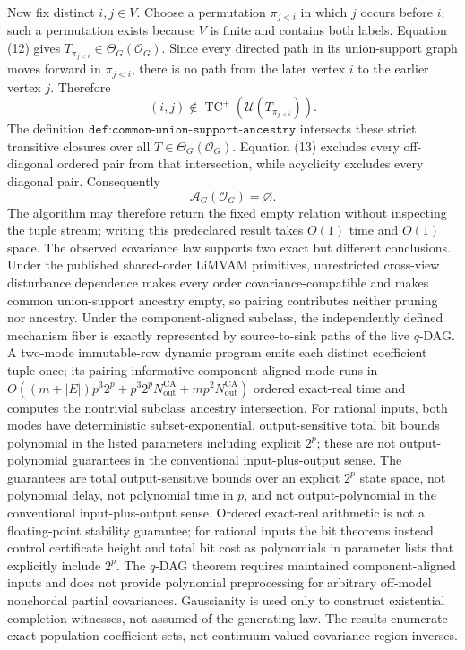 Now fix distinct \(i,j\in V\).  Choose a permutation \(\pi_{j<i}\) in which \(j\) occurs before \(i\); such a permutation exists because \(V\) is finite and contains both labels.  Equation (12) gives \(T_{\pi_{j<i}}\in\Theta_G(\mathcal O_G)\).  Since every directed path in its union-support graph moves forward in \(\pi_{j<i}\), there is no path from the later vertex \(i\) to the earlier vertex \(j\).  Therefore
\[
 (i,j)\notin
 \operatorname{TC}^{+}(\mathcal U(T_{\pi_{j<i}})).
\tag{13}
\]
The definition \(\texttt{def:common-union-support-ancestry}\) intersects these strict transitive closures over all \(T\in\Theta_G(\mathcal O_G)\).  Equation (13) excludes every off-diagonal ordered pair from that intersection, while acyclicity excludes every diagonal pair.  Consequently
\[
 \mathcal A_G(\mathcal O_G)=\varnothing.
\]
The algorithm may therefore return the fixed empty relation without inspecting the tuple stream; writing this predeclared result takes \(O(1)\) time and \(O(1)\) space.
The observed covariance law supports two exact but different conclusions. Under the published shared-order LiMVAM primitives, unrestricted cross-view disturbance dependence makes every order covariance-compatible and makes common union-support ancestry empty, so pairing contributes neither pruning nor ancestry. Under the component-aligned subclass, the independently defined mechanism fiber is exactly represented by source-to-sink paths of the live \(q\)-DAG. A two-mode immutable-row dynamic program emits each distinct coefficient tuple once; its pairing-informative component-aligned mode runs in \(O((m+|E|)p^3 2^p+p^3 2^pN_{\mathrm{out}}^{\mathrm{CA}}+mp^2N_{\mathrm{out}}^{\mathrm{CA}})\) ordered exact-real time and computes the nontrivial subclass ancestry intersection. For rational inputs, both modes have deterministic subset-exponential, output-sensitive total bit bounds polynomial in the listed parameters including explicit \(2^p\); these are not output-polynomial guarantees in the conventional input-plus-output sense.
The guarantees are total output-sensitive bounds over an explicit \(2^p\) state space, not polynomial delay, not polynomial time in \(p\), and not output-polynomial in the conventional input-plus-output sense. Ordered exact-real arithmetic is not a floating-point stability guarantee; for rational inputs the bit theorems instead control certificate height and total bit cost as polynomials in parameter lists that explicitly include \(2^p\). The \(q\)-DAG theorem requires maintained component-aligned inputs and does not provide polynomial preprocessing for arbitrary off-model nonchordal partial covariances. Gaussianity is used only to construct existential completion witnesses, not assumed of the generating law. The results enumerate exact population coefficient sets, not continuum-valued covariance-region inverses.
